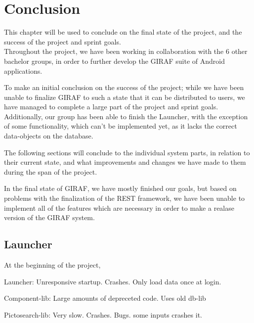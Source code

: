 \chapter{Conclusion}
This chapter will be used to conclude on the final state of the project, and the
success of the project and sprint goals. \\
Throughout the project, we have been working in collaboration with the 6 other
bachelor groups, in order to further develop the GIRAF suite of Android
applications.\nl

To make an initial conclusion on the success of the project; while we have been
unable to finalize GIRAF to such a state that it can be distributed to users, we
have managed to complete a large part of the project and sprint goals.
Additionally, our group has been able to finish the Launcher, with the exception
of some functionality, which can't be implemented yet, as it lacks the correct
data-objects on the database.\nl

The following sections will conclude to the individual system parts, in relation
to their current state, and what improvements and changes we have made to them
during the span of the project.\nl

In the final state of GIRAF, we have mostly finished our goals, but based on
problems with the finalization of the REST framework, we have been unable to
implement all of the features which are necessary in order to make a realase
version of the GIRAF system.

\section{Launcher}
At the beginning of the project, 

Launcher:
Unresponsive startup.
Crashes.
Only load data once at login.

Component-lib:
Large amounts of depreceted code.
Uses old db-lib

Pictosearch-lib:
Very slow.
Crashes.
Bugs.
some  inputs crashes it.